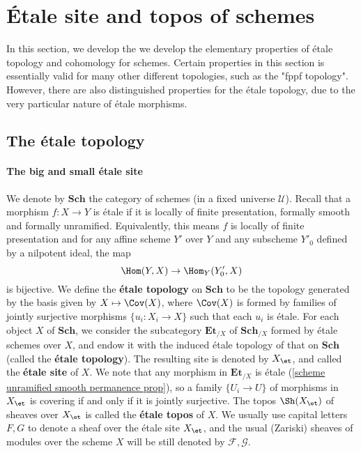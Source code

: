 \section{\'Etale site and topos of schemes}
In this section, we develop the we develop the elementary properties of \'etale topology and cohomology for schemes. Certain properties in this section is essentially valid for many other different topologies, such as the "fppf topology". However, there are also distinguished properties for the \'etale topology, due to the very particular nature of \'etale morphisms.

\subsection{The \'etale topology}
\paragraph{The big and small \'etale site}
We denote by $\mathbf{Sch}$ the category of schemes (in a fixed universe $\mathscr{U}$). Recall that a morphism $f:X\to Y$ is \'etale if it is locally of finite presentation, formally smooth and formally unramified. Equivalently, this means $f$ is locally of finite presentation and for any affine scheme $Y'$ over $Y$ and any subscheme $Y'_0$ defined by a nilpotent ideal, the map
\[\Hom(Y,X)\to\Hom_Y(Y'_0,X)\]
is bijective. We define the \textbf{\'etale topology} on $\mathbf{Sch}$ to be the topology generated by the basis given by $X\mapsto\Cov(X)$, where $\Cov(X)$ is formed by families of jointly surjective morphisms $\{u_i:X_i\to X\}$ such that each $u_i$ is \'etale. For each object $X$ of $\mathbf{Sch}$, we consider the subcategory $\mathbf{Et}_{/X}$ of $\mathbf{Sch}_{/X}$ formed by \'etale schemes over $X$, and endow it with the induced \'etale topology of that on $\mathbf{Sch}$ (called the \textbf{\'etale topology}). The resulting site is denoted by $X_{\et}$, and called the \textbf{\'etale site} of $X$. We note that any morphism in $\mathbf{Et}_{/X}$ is \'etale (\cref{scheme unramified smooth permanence prop}), so a family $\{U_i\to U\}$ of morphisms in $X_\et$ is covering if and only if it is jointly surjective. The topos $\Sh(X_{\et})$ of sheaves over $X_\et$ is called the \textbf{\'etale topos} of $X$. We usually use capital letters $F,G$ to denote a sheaf over the \'etale site $X_\et$, and the usual (Zariski) sheaves of modules over the scheme $X$ will be still denoted by $\mathscr{F},\mathscr{G}$.

